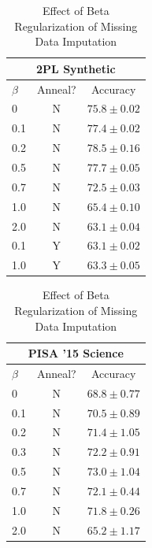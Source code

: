 \begin{table}[h!]
    \caption{Effect of Beta Regularization of Missing Data Imputation}
    \label{table:beta}
    \begin{subtable}{\textwidth}
    \begin{center}
    \begin{tabular}{lcc}
    \hline
    \multicolumn{3}{c}{2PL Synthetic} \\
    \hline
    $\beta$ & Anneal? & Accuracy \\
    \hline
    0 & N & $75.8 \pm 0.02$ \\
    0.1 & N & $77.4 \pm 0.02$ \\
    0.2 & N & $\mathbf{78.5 \pm 0.16}$ \\
    0.5 & N & $77.7 \pm 0.05$ \\
    0.7 & N & $72.5 \pm 0.03$ \\
    1.0 & N & $65.4 \pm 0.10$ \\
    2.0 & N & $63.1 \pm 0.04$ \\
    \hline
    0.1 & Y & $63.1 \pm 0.02$ \\
    1.0 & Y & $63.3 \pm 0.05$ \\
    \hline
    \end{tabular}
    \end{center}
    \end{subtable}
    \newline
    \vspace*{1 cm}
    \newline
    \begin{subtable}{\textwidth}
    \begin{center}
    \begin{tabular}{lcc}
    \hline
    \multicolumn{3}{c}{PISA '15 Science} \\
    \hline
    $\beta$ & Anneal? & Accuracy \\
    \hline
    0 & N & $68.8 \pm 0.77$ \\
    0.1 & N & $70.5 \pm 0.89$ \\
    0.2 & N & $71.4 \pm 1.05$ \\
    0.3 & N & $72.2 \pm 0.91$ \\
    0.5 & N & $\mathbf{73.0 \pm 1.04}$ \\
    0.7 & N & $72.1 \pm 0.44$ \\
    1.0 & N & $71.8 \pm 0.26$ \\
    2.0 & N & $65.2 \pm 1.17$ \\
    \hline
    \end{tabular}
    \end{center}
    \end{subtable}
\end{table}

